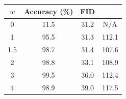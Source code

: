 \centering
\begin{tabular}{cccc}
    \toprule
    \(w\) & Accuracy (\%) & FID  & \fidclass{} \\
    \midrule
    0     & 11.5          & 31.2 & N/A         \\
    1     & 95.5          & 31.3 & 112.1       \\
    1.5   & 98.7          & 31.4 & 107.6       \\
    2     & 98.8          & 33.1 & 108.9       \\
    3     & 99.5          & 36.0 & 112.4       \\
    4     & 98.9          & 39.0 & 117.5       \\
    \bottomrule
\end{tabular}
